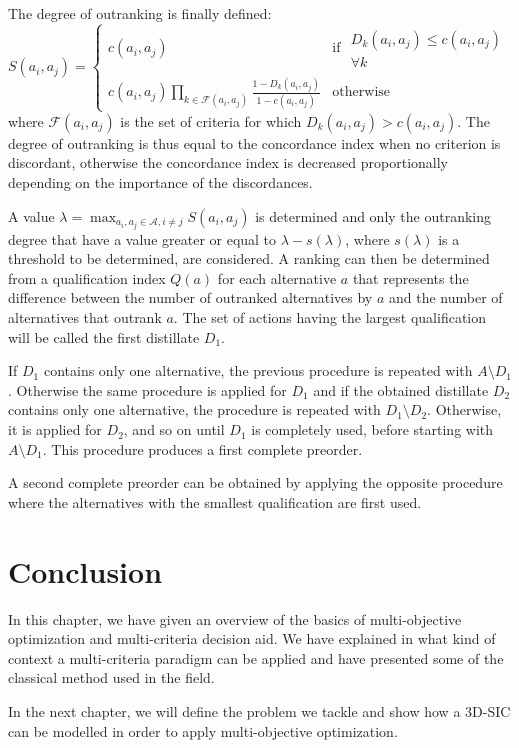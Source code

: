 \begin{enumerate}
The degree of outranking is finally defined:
\begin{equation}
S(a_i,a_j) = \begin{cases}
	c(a_i,a_j) & \text{if } \begin{array}{rr}D_k(a_i,a_j) \leq c(a_i,a_j)\\
		\forall k \end{array}\\
	c(a_i,a_j) \prod_{k \in \mathcal{F}(a_i,a_j)} \frac{1-D_k(a_i,a_j)}{1-c(a_i,a_j)} & \text{otherwise}
	\end{cases}
\end{equation}
where $\mathcal{F}(a_i,a_j)$ is the set of criteria for which $D_k(a_i,a_j) > c(a_i,a_j)$. The degree of outranking is thus equal to the concordance index when no criterion is discordant, otherwise the concordance index is decreased proportionally depending on the importance of the discordances.

A value $\lambda = \max_{a_i,a_j \in \mathcal{A}, i \neq j} S(a_i, a_j)$ is determined and only the outranking degree that have a value greater or equal to $\lambda - s(\lambda)$, where $s(\lambda)$ is a threshold to be determined, are considered. A ranking can then be determined from a qualification index $Q(a)$ for each alternative $a$ that represents the difference between the number of outranked alternatives by $a$ and the number of alternatives that outrank $a$. The set of actions having the largest qualification will be called the first distillate $D_1$.

If $D_1$ contains only one alternative, the previous procedure is repeated with $A \setminus D_1$. Otherwise the same procedure is applied for $D_1$ and if the obtained distillate $D_2$ contains only one alternative, the procedure is repeated with $D_1 \setminus D_2$. Otherwise, it is applied for $D_2$, and so on until $D_1$ is completely used, before starting with $A \setminus D_1$. This procedure produces a first complete preorder.

A second complete preorder can be obtained by applying the opposite procedure where the alternatives with the smallest qualification are first used.

%
\end{enumerate}

\section{Conclusion}
In this chapter, we have given an overview of the basics of multi-objective optimization and multi-criteria decision aid. We have explained in what kind of context a multi-criteria paradigm can be applied and have presented some of the classical method used in the field.

In the next chapter, we will define the problem we tackle and show how a 3D-SIC can be modelled in order to apply multi-objective optimization.